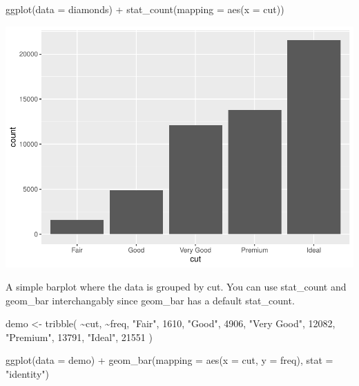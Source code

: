 \documentclass[
]{article}
\newenvironment{Shaded}{\begin{snugshade}}{\end{snugshade}}
\newcommand{\AttributeTok}[1]{\textcolor[rgb]{0.77,0.63,0.00}{#1}}
\newcommand{\DecValTok}[1]{\textcolor[rgb]{0.00,0.00,0.81}{#1}}
\newcommand{\FunctionTok}[1]{\textcolor[rgb]{0.00,0.00,0.00}{#1}}
\newcommand{\NormalTok}[1]{#1}
\newcommand{\OtherTok}[1]{\textcolor[rgb]{0.56,0.35,0.01}{#1}}
\newcommand{\SpecialCharTok}[1]{\textcolor[rgb]{0.00,0.00,0.00}{#1}}
\newcommand{\StringTok}[1]{\textcolor[rgb]{0.31,0.60,0.02}{#1}}
\begin{document}
\begin{Shaded}
\begin{Highlighting}[]
\FunctionTok{ggplot}\NormalTok{(}\AttributeTok{data =}\NormalTok{ diamonds) }\SpecialCharTok{+} 
  \FunctionTok{stat\_count}\NormalTok{(}\AttributeTok{mapping =} \FunctionTok{aes}\NormalTok{(}\AttributeTok{x =}\NormalTok{ cut))}
\end{Highlighting}
\end{Shaded}

\includegraphics{Journal_files/figure-latex/unnamed-chunk-44-2.pdf}

A simple barplot where the data is grouped by cut. You can use
stat\_count and geom\_bar interchangably since geom\_bar has a default
stat\_count.

\begin{Shaded}
\begin{Highlighting}[]
\NormalTok{demo }\OtherTok{\textless{}{-}} \FunctionTok{tribble}\NormalTok{(}
  \SpecialCharTok{\textasciitilde{}}\NormalTok{cut,         }\SpecialCharTok{\textasciitilde{}}\NormalTok{freq,}
  \StringTok{"Fair"}\NormalTok{,       }\DecValTok{1610}\NormalTok{,}
  \StringTok{"Good"}\NormalTok{,       }\DecValTok{4906}\NormalTok{,}
  \StringTok{"Very Good"}\NormalTok{,  }\DecValTok{12082}\NormalTok{,}
  \StringTok{"Premium"}\NormalTok{,    }\DecValTok{13791}\NormalTok{,}
  \StringTok{"Ideal"}\NormalTok{,      }\DecValTok{21551}
\NormalTok{)}

\FunctionTok{ggplot}\NormalTok{(}\AttributeTok{data =}\NormalTok{ demo) }\SpecialCharTok{+}
  \FunctionTok{geom\_bar}\NormalTok{(}\AttributeTok{mapping =} \FunctionTok{aes}\NormalTok{(}\AttributeTok{x =}\NormalTok{ cut, }\AttributeTok{y =}\NormalTok{ freq), }\AttributeTok{stat =} \StringTok{"identity"}\NormalTok{)}
\end{Highlighting}
\end{Shaded}
\end{document}
